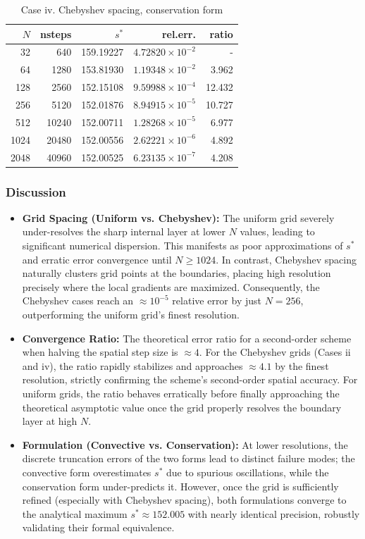 \documentclass[11pt]{article}
\begin{document}
\begin{table}[H]
\centering
\caption{Case iv. Chebyshev spacing, conservation form}
\begin{tabular}{@{}rrrrr@{}}
\toprule
$N$ & nsteps & $s^*$ & rel.err. & ratio \\
\midrule
  32 &   640 & 159.19227 & $4.72820 \times 10^{-2}$ & - \\
  64 &  1280 & 153.81930 & $1.19348 \times 10^{-2}$ & 3.962 \\
 128 &  2560 & 152.15108 & $9.59988 \times 10^{-4}$ & 12.432 \\
 256 &  5120 & 152.01876 & $8.94915 \times 10^{-5}$ & 10.727 \\
 512 & 10240 & 152.00711 & $1.28268 \times 10^{-5}$ & 6.977 \\
1024 & 20480 & 152.00556 & $2.62221 \times 10^{-6}$ & 4.892 \\
2048 & 40960 & 152.00525 & $6.23135 \times 10^{-7}$ & 4.208 \\
\bottomrule
\end{tabular}
\end{table}

\subsubsection*{Discussion}
\begin{itemize}
    \item \textbf{Grid Spacing (Uniform vs. Chebyshev):} The uniform grid severely under-resolves the sharp internal layer at lower $N$ values, leading to significant numerical dispersion. This manifests as poor approximations of $s^*$ and erratic error convergence until $N \ge 1024$. In contrast, Chebyshev spacing naturally clusters grid points at the boundaries, placing high resolution precisely where the local gradients are maximized. Consequently, the Chebyshev cases reach an $\approx 10^{-5}$ relative error by just $N=256$, outperforming the uniform grid's finest resolution.
    \item \textbf{Convergence Ratio:} The theoretical error ratio for a second-order scheme when halving the spatial step size is $\approx 4$. For the Chebyshev grids (Cases ii and iv), the ratio rapidly stabilizes and approaches $\approx 4.1$ by the finest resolution, strictly confirming the scheme's second-order spatial accuracy. For uniform grids, the ratio behaves erratically before finally approaching the theoretical asymptotic value once the grid properly resolves the boundary layer at high $N$.
    \item \textbf{Formulation (Convective vs. Conservation):} At lower resolutions, the discrete truncation errors of the two forms lead to distinct failure modes; the convective form overestimates $s^*$ due to spurious oscillations, while the conservation form under-predicts it. However, once the grid is sufficiently refined (especially with Chebyshev spacing), both formulations converge to the analytical maximum $s^* \approx 152.005$ with nearly identical precision, robustly validating their formal equivalence.
\end{itemize}
\end{document}
